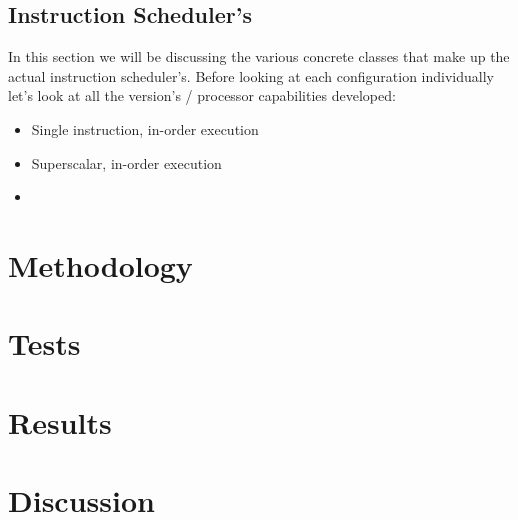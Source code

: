 \documentclass{article}
\begin{document}
\subsection{Instruction Scheduler's}
In this section we will be discussing the various concrete classes that make up the actual instruction scheduler's. Before looking at each configuration individually let's look at all the version's / processor capabilities developed:
\begin{itemize}
    \item Single instruction, in-order execution
    \item Superscalar, in-order execution
    \item 
\end{itemize}

\section{Methodology}

\section{Tests}

\section{Results}

\section{Discussion}
\end{document}
